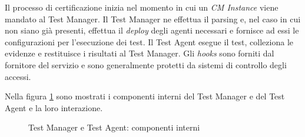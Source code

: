 \documentclass[../main.tex]{subfiles}
\begin{document}
Il processo di certificazione inizia nel  momento in cui  un \textit{CM Instance} viene mandato al Test Manager.
Il Test Manager ne effettua il parsing e, nel caso in cui non siano già presenti, effettua il \textit{deploy} degli agenti necessari e fornisce ad essi le configurazioni per l'esecuzione dei test.
Il Test Agent esegue il test, colleziona le evidenze e restituisce i risultati al Test Manager.
Gli \textit{hooks} sono forniti dal fornitore del servizio e sono generalmente protetti da sistemi di controllo degli accessi.

Nella figura \ref{fig:TMTAComponents} sono mostrati i componenti interni del Test Manager e del Test Agent e la loro interazione.

\begin{figure}[H]
\centering
{}
\caption{Test Manager e Test Agent: componenti interni \cite{Cloud1}}\label{fig:TMTAComponents}
\end{figure}
\end{document}
